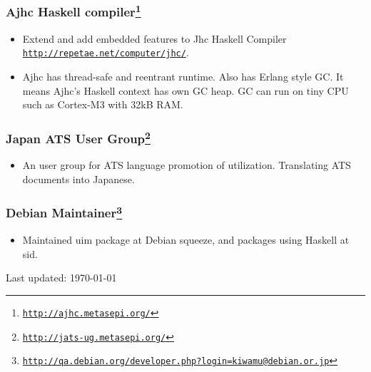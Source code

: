 \documentclass[letterpaper]{article}
\def\footer{
  \begin{center}
    \begin{footnotesize}
      Last updated: \today
    \end{footnotesize}
  \end{center}
}
\begin{document}
\subsubsection*{Ajhc Haskell compiler\footnote{\href{http://ajhc.metasepi.org/}{\tt http://ajhc.metasepi.org/}}}
\begin{itemize}
\item Extend and add embedded features to Jhc Haskell Compiler \href{http://repetae.net/computer/jhc/}{\tt http://repetae.net/computer/jhc/}.
\item Ajhc has thread-safe and reentrant runtime. Also has Erlang style GC. It means Ajhc's Haskell context has own GC heap. GC can run on tiny CPU such as Cortex-M3 with 32kB RAM.
\end{itemize}

\subsubsection*{Japan ATS User Group\footnote{\href{http://jats-ug.metasepi.org/}{\tt http://jats-ug.metasepi.org/}}}
\begin{itemize}
\item An user group for ATS language promotion of utilization. Translating ATS documents into Japanese.
\end{itemize}

\subsubsection*{Debian Maintainer\footnote{\href{http://qa.debian.org/developer.php?login=kiwamu@debian.or.jp}{\tt http://qa.debian.org/developer.php?login=kiwamu@debian.or.jp}}}
\begin{itemize}
\item Maintained uim package at Debian squeeze, and packages using Haskell at sid.
\end{itemize}

\bigskip
\footer
\end{document}
